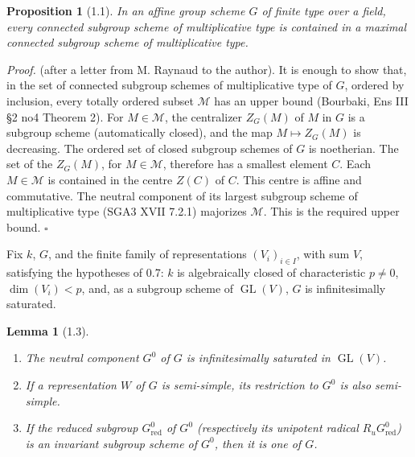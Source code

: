 \documentclass[10pt]{article}
\newcommand{\GL}{\operatorname{GL}}
\newcommand{\Ru}{R_u}
\newcommand{\red}{\mathrm{red}}
\theoremstyle{deligne}
\newtheorem*{proposition*}{Proposition}
\newtheorem*{lemma*}{Lemma}
\newenvironment{proofdel}{\textit{Proof.}}{\hfill$\square$}
\newcommand{\heading}[1]{\vspace{0.7em}\noindent{\bfseries #1}\quad}
\begin{document}
\begin{proposition*}[1.1]
In an affine group scheme \(G\) of finite type over a field, every connected subgroup scheme of multiplicative type is contained in a maximal connected subgroup scheme of multiplicative type.
\end{proposition*}

\begin{proofdel}
(after a letter from M. Raynaud to the author). It is enough to show that, in the set of connected subgroup schemes of multiplicative type of \(G\), ordered by inclusion, every totally ordered subset \(\mathcal M\) has an upper bound (Bourbaki, Ens III §2 no4 Theorem 2). For \(M\in\mathcal M\), the centralizer \(Z_G(M)\) of \(M\) in \(G\) is a subgroup scheme (automatically closed), and the map \(M\mapsto Z_G(M)\) is decreasing. The ordered set of closed subgroup schemes of \(G\) is noetherian. The set of the \(Z_G(M)\), for \(M\in\mathcal M\), therefore has a smallest element \(C\). Each \(M\in\mathcal M\) is contained in the centre \(Z(C)\) of \(C\). This centre is affine and commutative. The neutral component of its largest subgroup scheme of multiplicative type (SGA3 XVII 7.2.1) majorizes \(\mathcal M\). This is the required upper bound.
\end{proofdel}

\heading{1.2.} Fix \(k\), \(G\), and the finite family of representations \((V_i)_{i\in I}\), with sum \(V\), satisfying the hypotheses of 0.7: \(k\) is algebraically closed of characteristic \(p\ne0\), \(\dim(V_i)<p\), and, as a subgroup scheme of \(\GL(V)\), \(G\) is infinitesimally saturated.

\begin{lemma*}[1.3]
\begin{enumerate}[label=(\roman*)]
\item The neutral component \(G^0\) of \(G\) is infinitesimally saturated in \(\GL(V)\).
\item If a representation \(W\) of \(G\) is semi-simple, its restriction to \(G^0\) is also semi-simple.
\item If the reduced subgroup \(G^0_{\red}\) of \(G^0\) (respectively its unipotent radical \(\Ru G^0_{\red}\)) is an invariant subgroup scheme of \(G^0\), then it is one of \(G\).
\end{enumerate}
\end{lemma*}
\end{document}

